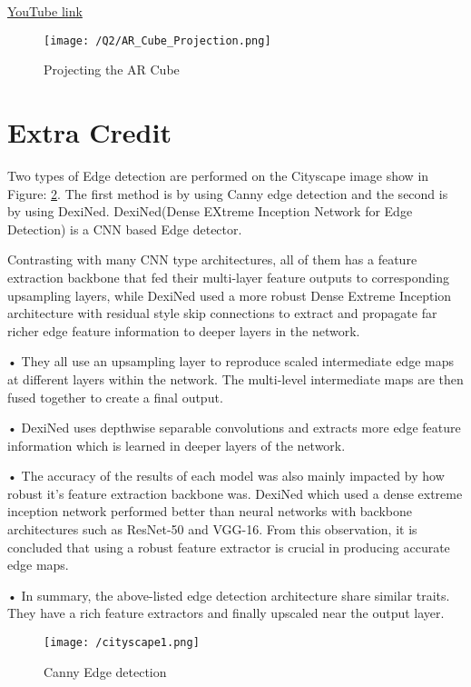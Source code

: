 \documentclass[a4paper, 10pt]{article}
\begin{document}
\begin{multicols}{2}
		\href{https://youtu.be/Fvx0soFXT98}{YouTube link}
		
		\begin{figure}[H]
			\centering
			\texttt{[image: /Q2/AR\_Cube\_Projection.png]}
			\caption{Projecting the AR Cube}
			\label{fig:ARCube}
		\end{figure}
		
	
		
		\section{Extra Credit}
		
		Two types of Edge detection are performed on the Cityscape image show in Figure: \ref{fig:cityscape}. The first method is by using Canny edge detection and the second is by using DexiNed. DexiNed(Dense EXtreme Inception Network for Edge Detection) is a CNN based Edge detector.
		
		Contrasting with many CNN type architectures, all of them has a feature extraction backbone that fed their multi-layer feature outputs to
		corresponding upsampling layers, while DexiNed used a more robust Dense Extreme Inception architecture with residual style skip connections to extract and	propagate far richer edge feature information to deeper layers in the network.
		
		• They all use an upsampling layer to reproduce scaled intermediate edge maps at different
		layers within the network. The multi-level intermediate maps are then fused together to
		create a final output.
		
		• DexiNed uses depthwise separable convolutions and extracts more edge feature information which is learned in deeper layers of the network.
		
		• The accuracy of the results of each model was also mainly impacted by how robust it’s
		feature extraction backbone was. DexiNed which used a dense extreme inception network
		performed better than neural networks with backbone architectures such as ResNet-50 and VGG-16. From this observation, it is concluded that using a robust feature extractor is crucial
		in producing accurate edge maps.
		
		• In summary, the above-listed edge detection architecture share similar traits. They have a rich feature extractors and finally upscaled near the output layer.
		
		\begin{figure}[H]
			\centering
			\texttt{[image: /cityscape1.png]}
			\caption{Canny Edge detection}
			\label{fig:cityscape}
		\end{figure}
		

\end{multicols}
\end{document}
